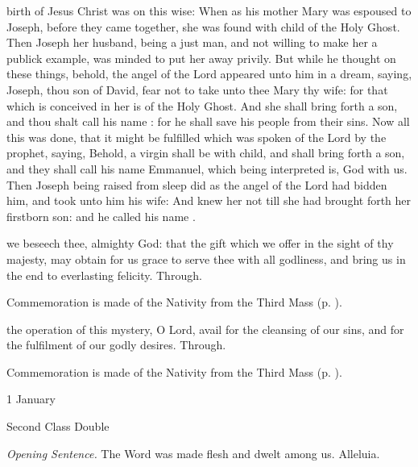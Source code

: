  birth of Jesus Christ was on this wise: When as his mother Mary was espoused to Joseph, before they came together, she was found with child of the Holy Ghost. Then Joseph her husband, being a just man, and not willing to make her a publick example, was minded to put her away privily. But while he thought on these things, behold, the angel of the Lord appeared unto him in a dream, saying, Joseph, thou son of David, fear not to take unto thee Mary thy wife: for that which is conceived in her is of the Holy Ghost. And she shall bring forth a son, and thou shalt call his name : for he shall save his people from their sins. Now all this was done, that it might be fulfilled which was spoken of the Lord by the prophet, saying, Behold, a virgin shall be with child, and shall bring forth a son, and they shall call his name Emmanuel, which being interpreted is, God with us. Then Joseph being raised from sleep did as the angel of the Lord had bidden him, and took unto him his wife: And knew her not till she had brought forth her firstborn son: and he called his name .

\secret
{} we beseech thee, almighty God: that the gift which we offer in the sight of thy majesty, may obtain for us grace to serve thee with all godliness, and bring us in the end to everlasting felicity. Through.
\begin{rubric}
    Commemoration is made of the Nativity from the Third Mass (p. \pageref{NativityMassIII}).
\end{rubric}
\postcommunion
{} the operation of this mystery, O Lord, avail for the cleansing of our sins, and for the fulfilment of our godly desires. Through.
\begin{rubric}
    Commemoration is made of the Nativity from the Third Mass (p. \pageref{NativityMassIII}).
\end{rubric}
\clearpage
{}
\begin{inhead}
{1 January}\par
{Second Class Double}
\end{inhead}
\par\noindent
\textit{Opening Sentence.} The Word was made flesh and dwelt among us. Alleluia.

